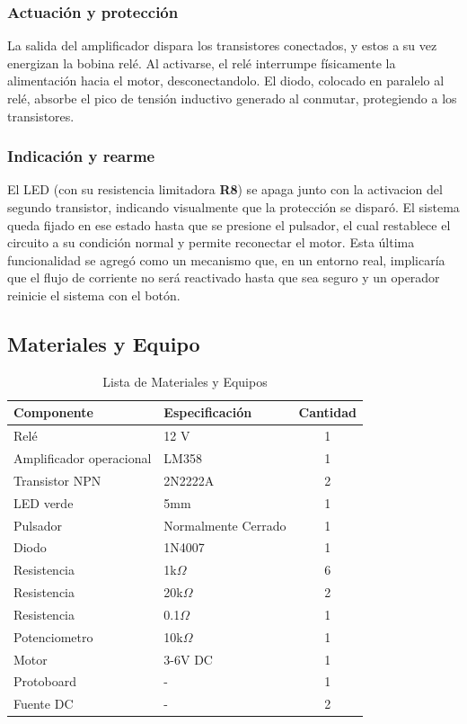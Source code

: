 \documentclass[conference]{IEEEtran}
\begin{document}
\subsubsection{\textbf{Actuación y protección\\}}
La salida del amplificador dispara los transistores conectados, y estos a su vez energizan la bobina relé. Al activarse, el relé interrumpe físicamente la alimentación hacia el motor, desconectandolo. El diodo, colocado en paralelo al relé, absorbe el pico de tensión inductivo generado al conmutar, protegiendo a los transistores.

\subsubsection{\textbf{Indicación y rearme}}
El LED (con su resistencia limitadora \textbf{R8}) se apaga junto con la activacion del segundo transistor, indicando visualmente que la protección se disparó. El sistema queda fijado en ese estado hasta que se presione el pulsador, el cual restablece el circuito a su condición normal y permite reconectar el motor. Esta última funcionalidad se agregó como un mecanismo que, en un entorno real, implicaría que el flujo de corriente no será reactivado hasta que sea seguro y un operador reinicie el sistema con el botón.

\subsection{Materiales y Equipo}
	\begin{table}[h]
		\caption{Lista de Materiales y Equipos}
		\label{tab:materiales}
		\centering
		\begin{tabular}{l l c}
			\hline
			\textbf{Componente} & \textbf{Especificación} & \textbf{Cantidad} \\
			\hline
			Relé & 12 V & 1\\
			Amplificador operacional & LM358 & 1\\
			Transistor NPN & 2N2222A & 2\\
			LED verde & 5mm & 1\\
			Pulsador & Normalmente Cerrado & 1\\
			Diodo & 1N4007 & 1\\
			Resistencia & 1k$\Omega$ & 6\\
			Resistencia & 20k$\Omega$ & 2\\
			Resistencia & 0.1$\Omega$ & 1\\
			Potenciometro & 10k$\Omega$ & 1\\
			Motor & 3-6V DC & 1\\
			Protoboard & - & 1\\
            Fuente DC & - & 2\\
			\hline
		\end{tabular}
	\end{table}
\end{document}
